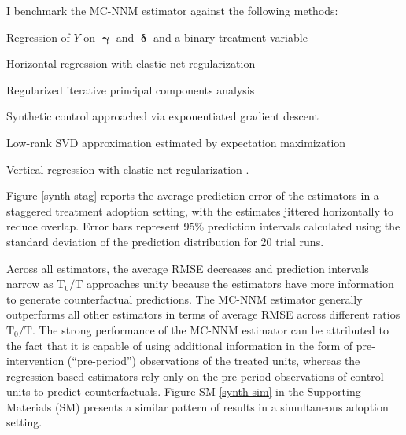 \documentclass[hidelinks,12pt]{article}
\begin{document}
I benchmark the MC-NNM estimator against the following methods:

\begin{description}
	{\setlength\itemindent{1mm}
		\item[DID] Regression of $Y$ on $\boldsymbol{\upgamma}$ and $\boldsymbol{\updelta}$ and a binary treatment variable \citep{athey2017matrix}
		\item[HR-EN] Horizontal regression with elastic net regularization \citep{athey2017matrix} 
		\item[PCA] Regularized iterative principal components analysis \citep{ilin2010practical}
		\item[SC-ADH] Synthetic control approached via exponentiated gradient descent \citep{abadie2010synthetic}
		\item[SVD] Low-rank SVD approximation estimated by expectation maximization \citep{troyanskaya2001missing}
		\item[VT-EN] Vertical regression with elastic net regularization \citep{athey2017matrix}.
	}
\end{description}

Figure \ref{synth-stag} reports the average prediction error of the estimators in a staggered treatment adoption setting, with the estimates jittered horizontally to reduce overlap. Error bars represent 95\% prediction intervals calculated using the standard deviation of the prediction distribution for 20 trial runs. 

Across all estimators, the average RMSE decreases and prediction intervals narrow as $\text{T}_0/\text{T}$ approaches unity because the estimators have more information to generate counterfactual predictions. The MC-NNM estimator generally outperforms all other estimators in terms of average RMSE across different ratios $\text{T}_0/\text{T}$.  The strong performance of the MC-NNM estimator can be attributed to the fact that it is capable of using additional information in the form of pre-intervention (``pre-period'') observations of the treated units, whereas the regression-based estimators rely only on the pre-period observations of control units to predict counterfactuals. Figure SM-\ref{synth-sim} in the Supporting Materials (SM) presents a similar pattern of results in a simultaneous adoption setting.
\end{document}
